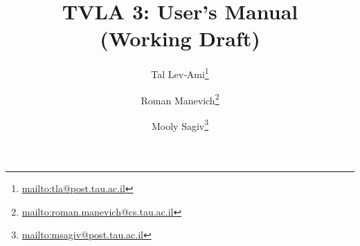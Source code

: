 \documentclass[11pt]{article}
\begin{document}
\hfuzz 2pt %
\textheight 20cm

\title{TVLA 3: User's Manual\\(Working Draft)}

\author{Tal Lev-Ami\thanks{\url{mailto:tla@post.tau.ac.il}}
\and Roman Manevich\thanks{\url{mailto:roman.manevich@cs.tau.ac.il}} \and
Mooly Sagiv\thanks{\url{mailto:msagiv@post.tau.ac.il}}}

\maketitle

\tableofcontents

\newpage





\newpage


%
%
%

%

\newpage
{}



\appendix

\end{document}
